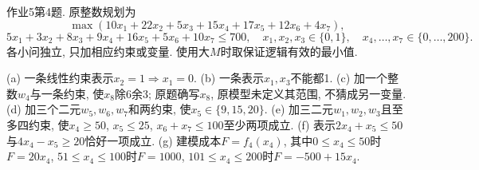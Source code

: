 \begin{exercise}\label{ass:15053-ps5-q4}
作业5第4题. 原整数规划为
\[
\max(10x_1+22x_2+5x_3+15x_4+17x_5+12x_6+4x_7),
\]
\[
5x_1+3x_2+8x_3+9x_4+16x_5+5x_6+10x_7\le700,
\quad x_1,x_2,x_3\in\{0,1\},\quad x_4,\ldots,x_7\in\{0,\ldots,200\}.
\]
各小问独立, 只加相应约束或变量. 使用大$M$时取保证逻辑有效的最小值.

(a) 一条线性约束表示$x_2=1\Rightarrow x_1=0$. (b) 一条表示$x_1,x_3$不能都1. (c) 加一个整数$w_4$与一条约束, 使$x_8$除6余3; 原题确写$x_8$, 原模型未定义其范围, 不猜成另一变量. (d) 加三个二元$w_5,w_6,w_7$和两约束, 使$x_5\in\{9,15,20\}$. (e) 加三二元$w_1,w_2,w_3$且至多四约束, 使$x_4\ge50$, $x_5\le25$, $x_6+x_7\le100$至少两项成立. (f) 表示$2x_4+x_5\le50$与$4x_4-x_5\ge20$恰好一项成立. (g) 建模成本$F=f_4(x_4)$, 其中$0\le x_4\le50$时$F=20x_4$, $51\le x_4\le100$时$F=1000$, $101\le x_4\le200$时$F=-500+15x_4$.
\end{exercise}
